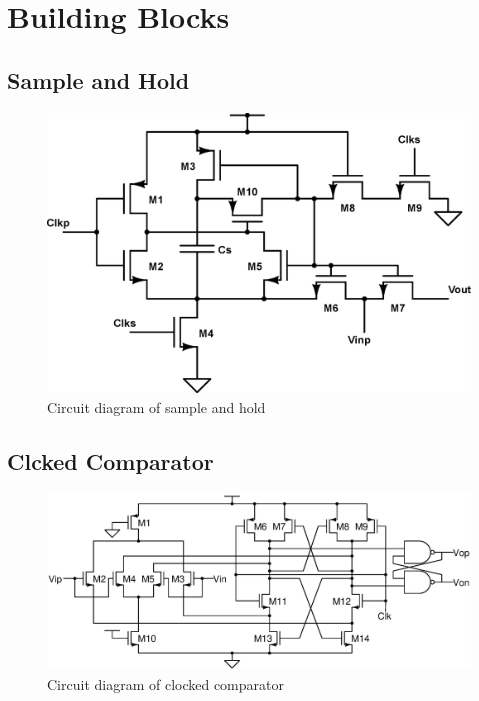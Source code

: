 \chapter{Building Blocks}

\section{Sample and Hold}
\begin{figure}[H]
	\begin{center}
		\includegraphics[scale=0.4]{./Figures/BSS.eps}
		\caption{Circuit diagram of sample and hold}
		\label{fig:BSS}
	\end{center}
\end{figure}

\section{Clcked Comparator}
\begin{figure}[H]
	\begin{center}
		\includegraphics[scale=0.6]{./Figures/CMP.eps}
		\caption{Circuit diagram of clocked comparator}
		\label{fig:CMP}
	\end{center}
\end{figure}

